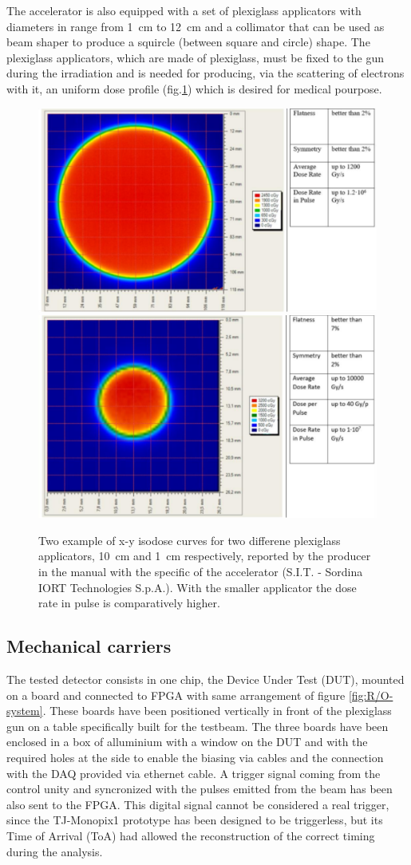       The accelerator is also equipped with a set of plexiglass applicators with diameters in range from \SI{1}{cm} to \SI{12}{cm} and a collimator that can be used as beam shaper to produce a squircle (between square and circle) shape.
      The plexiglass applicators, which are made of plexiglass, must be fixed to the gun during the irradiation and is needed for producing,  via the scattering of electrons with it, an uniform dose profile (fig.\ref{fig:dose_profile}) which is desired for medical pourpose.
      \begin{figure}[h!]
         \centering
         \includegraphics[width=.49\linewidth]{figures/test_beam/dose_profile_10cm.pdf}
         \includegraphics[width=.49\linewidth]{figures/test_beam/dose_profile_1cm.pdf}
         \caption{Two example of x-y isodose curves for two differene plexiglass applicators, \SI{10}{cm} and \SI{1}{cm} respectively, reported by the producer in the manual with the specific of the accelerator (S.I.T. - Sordina IORT Technologies S.p.A.). With the smaller applicator the dose rate in pulse is comparatively higher.}
         \label{fig:dose_profile}
      \end{figure}  

   \subsection{Mechanical carriers} 
      The tested detector consists in one chip, the Device Under Test (DUT), mounted on a board and connected to FPGA with same arrangement of figure \ref{fig:R/O-system}.
      These boards have been positioned vertically in front of the plexiglass gun on a table specifically built for the testbeam. The three boards have been enclosed in a box of alluminium with a window on the DUT and with the required holes at the side to enable the biasing via cables and the connection with the DAQ provided via ethernet cable.       
      A trigger signal coming from the control unity and syncronized with the pulses emitted from the beam has been also sent to the FPGA.
      This digital signal cannot be considered a real trigger, since the TJ-Monopix1 prototype has been designed to be triggerless, but its Time of Arrival (ToA) had allowed the reconstruction of the correct timing during the analysis.

